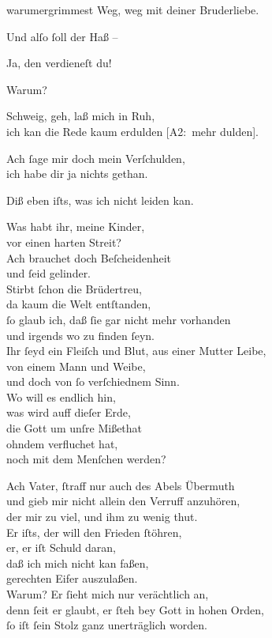 \documentclass[abbrwidth=6em,tocstyle=ref-genre]{ees}
\newcommand\altlyrics[1]{[\textmd{A2}:~#1]}
\begin{document}
{\begin{movement}{warumergrimmest}
  \voice[Cain]
  Weg, weg mit deiner Bruderliebe.

  \voice[Abel]
  Und alſo ſoll der Haß –

  \voice[Cain]
  Ja, den verdieneſt du!

  \voice[Abel]
  Warum?

  \voice[Cain]
  Schweig, geh, laß mich in Ruh,\\
  ich kan die Rede kaum erdulden \altlyrics{mehr dulden}.

  \voice[Abel]
  Ach ſage mir doch mein Verſchulden,\\
  ich habe dir ja nichts gethan.

  \voice[Cain]
  Diß eben iſts, was ich nicht leiden kan.

  \voice[Adam]
  Was habt ihr, meine Kinder,\\
  vor einen harten Streit?\\
  Ach brauchet doch Beſcheidenheit\\
  und ſeid gelinder.\\
  Stirbt ſchon die Brüdertreu,\\
  da kaum die Welt entſtanden,\\
  ſo glaub ich, daß ſie gar nicht mehr vorhanden\\
  und irgends wo zu finden ſeyn.\\
  Ihr ſeyd ein Fleiſch und Blut, aus einer Mutter Leibe,\\
  von einem Mann und Weibe,\\
  und doch von ſo verſchiednem Sinn.\\
  Wo will es endlich hin,\\
  was wird auff dieſer Erde,\\
  die Gott um unſre Mißethat\\
  ohndem verfluchet hat,\\
  noch mit dem Menſchen werden?

  \voice[Cain]
  Ach Vater, ſtraff nur auch des Abels Übermuth\\
  und gieb mir nicht allein den Verruff anzuhören,\\
  der mir zu viel, und ihm zu wenig thut.\\
  Er iſts, der will den Frieden ſtöhren,\\
  er, er iſt Schuld daran,\\
  daß ich mich nicht kan faßen,\\
  gerechten Eifer auszulaßen.\\
  Warum? Er ſieht mich nur verächtlich an,\\
  denn ſeit er glaubt, er ſteh bey Gott in hohen Orden,\\
  ſo iſt ſein Stolz ganz unerträglich worden.


\end{movement}}
\end{document}
